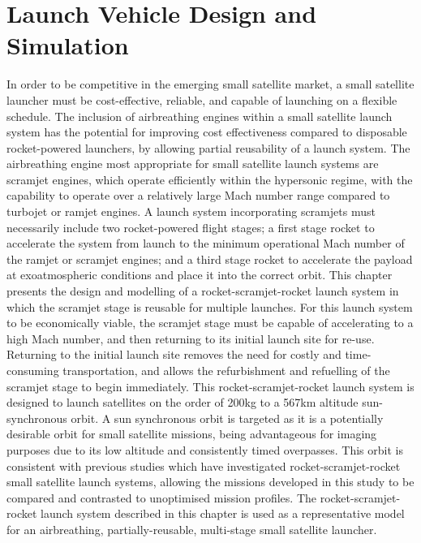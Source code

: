 
\cleardoublepage
\chapter{Launch Vehicle Design and Simulation}\label{chapter:methodology}

In order to be competitive in the emerging small satellite market, a small satellite launcher must be cost-effective, reliable, and capable of launching on a flexible schedule. The inclusion of airbreathing engines within a small satellite launch system has the potential for improving cost effectiveness compared to disposable rocket-powered launchers, by allowing partial reusability of a launch system. The airbreathing engine most appropriate for small satellite launch systems are scramjet engines, which operate efficiently within the hypersonic regime, with the capability to operate over a relatively large Mach number range compared to turbojet or ramjet engines. A launch system incorporating scramjets must necessarily include two rocket-powered flight stages; a first stage rocket to accelerate the system from launch to the minimum operational Mach number of the ramjet or scramjet engines; and a third stage rocket to accelerate the payload at exoatmospheric conditions and place it into the correct orbit. 
This chapter presents the design and modelling of a rocket-scramjet-rocket launch system in which the scramjet stage is reusable for multiple launches. 
For this launch system to be economically viable, the scramjet stage must be capable of accelerating to a high Mach number, and then returning to its initial launch site for re-use. Returning to the initial launch site removes the need for costly and time-consuming transportation, and allows the refurbishment and refuelling of the scramjet stage to begin immediately. 
This rocket-scramjet-rocket launch system is designed to launch satellites on the order of 200kg to a 567km altitude sun-synchronous orbit. A sun synchronous orbit is targeted as it is a potentially desirable orbit for small satellite missions, being advantageous for imaging purposes due to its low altitude and consistently timed overpasses. This orbit is consistent with previous studies which have investigated rocket-scramjet-rocket small satellite launch systems, allowing the missions developed in this study to be compared and contrasted to unoptimised mission profiles. 
The rocket-scramjet-rocket launch system described in this chapter is used as a representative model for an airbreathing, partially-reusable, multi-stage small satellite launcher. 



